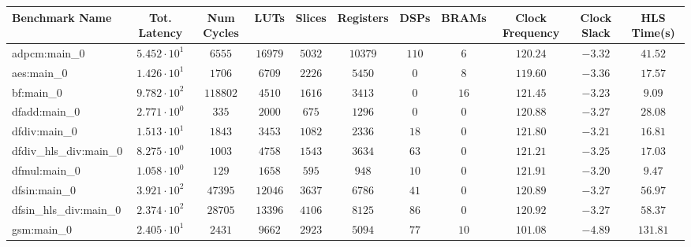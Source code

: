 \begin{tabular}{|l|c|c|c|c|c|c|c|c|c|c|}
\hline
Benchmark Name          & Tot. Latency           & Num Cycles & LUTs       & Slices    & Registers & DSPs    & BRAMs   & Clock Frequency & Clock Slack & HLS Time(s) \\
\hline
adpcm:main\_0           & $ 5.452 \cdot 10^{1} $ & $ 6555   $ & $ 16979  $ & $ 5032  $ & $ 10379 $ & $ 110 $ & $ 6   $ & $ 120.24      $ & $ -3.32   $ & $ 41.52   $ \\
aes:main\_0             & $ 1.426 \cdot 10^{1} $ & $ 1706   $ & $ 6709   $ & $ 2226  $ & $ 5450  $ & $ 0   $ & $ 8   $ & $ 119.60      $ & $ -3.36   $ & $ 17.57   $ \\
bf:main\_0              & $ 9.782 \cdot 10^{2} $ & $ 118802 $ & $ 4510   $ & $ 1616  $ & $ 3413  $ & $ 0   $ & $ 16  $ & $ 121.45      $ & $ -3.23   $ & $ 9.09    $ \\
dfadd:main\_0           & $ 2.771 \cdot 10^{0} $ & $ 335    $ & $ 2000   $ & $ 675   $ & $ 1296  $ & $ 0   $ & $ 0   $ & $ 120.88      $ & $ -3.27   $ & $ 28.08   $ \\
dfdiv:main\_0           & $ 1.513 \cdot 10^{1} $ & $ 1843   $ & $ 3453   $ & $ 1082  $ & $ 2336  $ & $ 18  $ & $ 0   $ & $ 121.80      $ & $ -3.21   $ & $ 16.81   $ \\
dfdiv\_hls\_div:main\_0 & $ 8.275 \cdot 10^{0} $ & $ 1003   $ & $ 4758   $ & $ 1543  $ & $ 3634  $ & $ 63  $ & $ 0   $ & $ 121.21      $ & $ -3.25   $ & $ 17.03   $ \\
dfmul:main\_0           & $ 1.058 \cdot 10^{0} $ & $ 129    $ & $ 1658   $ & $ 595   $ & $ 948   $ & $ 10  $ & $ 0   $ & $ 121.91      $ & $ -3.20   $ & $ 9.47    $ \\
dfsin:main\_0           & $ 3.921 \cdot 10^{2} $ & $ 47395  $ & $ 12046  $ & $ 3637  $ & $ 6786  $ & $ 41  $ & $ 0   $ & $ 120.89      $ & $ -3.27   $ & $ 56.97   $ \\
dfsin\_hls\_div:main\_0 & $ 2.374 \cdot 10^{2} $ & $ 28705  $ & $ 13396  $ & $ 4106  $ & $ 8125  $ & $ 86  $ & $ 0   $ & $ 120.92      $ & $ -3.27   $ & $ 58.37   $ \\
gsm:main\_0             & $ 2.405 \cdot 10^{1} $ & $ 2431   $ & $ 9662   $ & $ 2923  $ & $ 5094  $ & $ 77  $ & $ 10  $ & $ 101.08      $ & $ -4.89   $ & $ 131.81  $ \\

\end{tabular}

